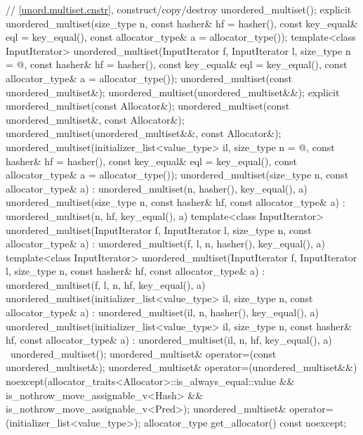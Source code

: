 \begin{codeblock}
{{    // \ref{unord.multiset.cnstr}, construct/copy/destroy
    unordered_multiset();
    explicit unordered_multiset(size_type n,
                                const hasher& hf = hasher(),
                                const key_equal& eql = key_equal(),
                                const allocator_type& a = allocator_type());
    template<class InputIterator>
      unordered_multiset(InputIterator f, InputIterator l,
                         size_type n = @\seebelow@,
                         const hasher& hf = hasher(),
                         const key_equal& eql = key_equal(),
                         const allocator_type& a = allocator_type());
    unordered_multiset(const unordered_multiset&);
    unordered_multiset(unordered_multiset&&);
    explicit unordered_multiset(const Allocator&);
    unordered_multiset(const unordered_multiset&, const Allocator&);
    unordered_multiset(unordered_multiset&&, const Allocator&);
    unordered_multiset(initializer_list<value_type> il,
                       size_type n = @\seebelow@,
                       const hasher& hf = hasher(),
                       const key_equal& eql = key_equal(),
                       const allocator_type& a = allocator_type());
    unordered_multiset(size_type n, const allocator_type& a)
      : unordered_multiset(n, hasher(), key_equal(), a) { }
    unordered_multiset(size_type n, const hasher& hf, const allocator_type& a)
      : unordered_multiset(n, hf, key_equal(), a) { }
    template<class InputIterator>
      unordered_multiset(InputIterator f, InputIterator l, size_type n, const allocator_type& a)
        : unordered_multiset(f, l, n, hasher(), key_equal(), a) { }
    template<class InputIterator>
      unordered_multiset(InputIterator f, InputIterator l, size_type n, const hasher& hf,
                         const allocator_type& a)
      : unordered_multiset(f, l, n, hf, key_equal(), a) { }
    unordered_multiset(initializer_list<value_type> il, size_type n, const allocator_type& a)
      : unordered_multiset(il, n, hasher(), key_equal(), a) { }
    unordered_multiset(initializer_list<value_type> il, size_type n, const hasher& hf,
                       const allocator_type& a)
      : unordered_multiset(il, n, hf, key_equal(), a) { }
    ~unordered_multiset();
    unordered_multiset& operator=(const unordered_multiset&);
    unordered_multiset& operator=(unordered_multiset&&)
      noexcept(allocator_traits<Allocator>::is_always_equal::value &&
               is_nothrow_move_assignable_v<Hash> &&
               is_nothrow_move_assignable_v<Pred>);
    unordered_multiset& operator=(initializer_list<value_type>);
    allocator_type get_allocator() const noexcept;

}}
\end{codeblock}
